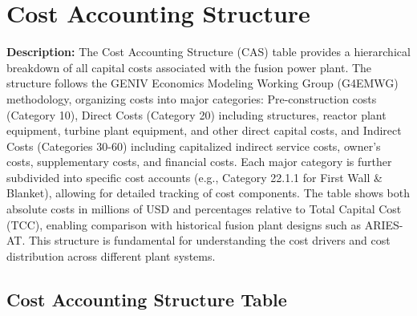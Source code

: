 \newpage 
\section{Cost Accounting Structure}

\textbf{Description:} The Cost Accounting Structure (CAS) table provides a hierarchical breakdown of all capital costs associated with the fusion power plant. The structure follows the GENIV Economics Modeling Working Group (G4EMWG) methodology, organizing costs into major categories: Pre-construction costs (Category 10), Direct Costs (Category 20) including structures, reactor plant equipment, turbine plant equipment, and other direct capital costs, and Indirect Costs (Categories 30-60) including capitalized indirect service costs, owner's costs, supplementary costs, and financial costs. Each major category is further subdivided into specific cost accounts (e.g., Category 22.1.1 for First Wall \& Blanket), allowing for detailed tracking of cost components. The table shows both absolute costs in millions of USD and percentages relative to Total Capital Cost (TCC), enabling comparison with historical fusion plant designs such as ARIES-AT. This structure is fundamental for understanding the cost drivers and cost distribution across different plant systems.

\subsection{Cost Accounting Structure Table}

